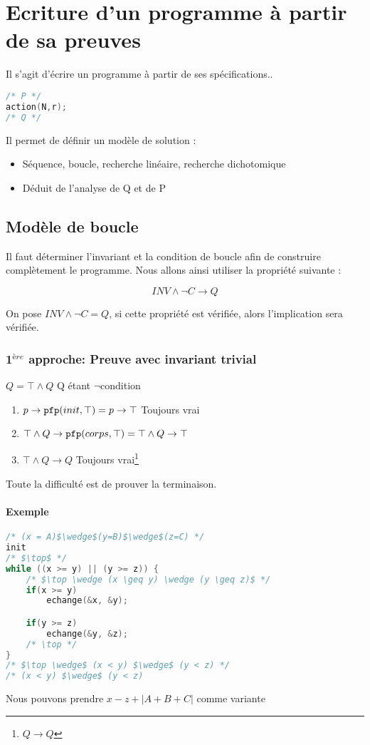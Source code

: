 \chapter{Ecriture d'un programme à partir de sa preuves}
Il s'agit d'écrire un programme à partir de ses spécifications..
\begin{lstlisting}[language=C, numbers=none]
/* P */
action(N,r);
/* Q */
\end{lstlisting}
Il permet de définir un modèle de solution : 
\begin{itemize}
	\item Séquence, boucle, recherche linéaire, recherche dichotomique
	\item Déduit de l'analyse de Q et de P
\end{itemize}

\section{Modèle de boucle}
	Il faut déterminer l'invariant et la condition de boucle afin de construire complètement le programme. Nous allons ainsi utiliser la propriété suivante : 

	$$ INV \wedge \neg C \rightarrow Q $$

	On pose $INV \wedge \neg C = Q$, si cette propriété est vérifiée, alors l'implication sera vérifiée.

	\subsection{1$^{ère}$ approche: Preuve avec invariant trivial}
	$Q = \top \wedge Q$ Q étant $\neg$condition 
	\begin{enumerate}
		\item $p \rightarrow \pfp (init , \top) = p \rightarrow \top$ Toujours vrai
		\item $\top \wedge Q \rightarrow \pfp(corps, \top) = \top \wedge Q \rightarrow \top$
		\item $\top \wedge Q \rightarrow Q$ Toujours vrai\footnote{$Q\rightarrow Q$} 
	\end{enumerate}
	Toute la difficulté est de prouver la terminaison.
	\subsubsection{Exemple}
	\begin{lstlisting}[language=C]
/* (x = A)$\wedge$(y=B)$\wedge$(z=C) */
init
/* $\top$ */
while ((x >= y) || (y >= z)) {
	/* $\top \wedge (x \geq y) \wedge (y \geq z)$ */
	if(x >= y) 
		echange(&x, &y);

	if(y >= z) 
		echange(&y, &z);
	/* \top */
}
/* $\top \wedge$ (x < y) $\wedge$ (y < z) */
/* (x < y) $\wedge$ (y < z)
	\end{lstlisting}
	Nous pouvons prendre $x-z + |A+B+C|$ comme variante

